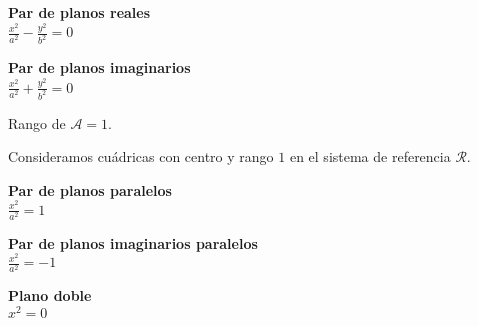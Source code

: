 \documentclass[11pt, a4paper]{article}
\newif\IfInSansMode
\theoremstyle{theorem-style}
\theoremstyle{definition-style}
\theoremstyle{remark-style}
\theoremstyle{example-style}
\begin{document}
\begin{minipage}[c]{0.45\textwidth}
  {\bf Par de planos reales}\vspace{1em}\\
  $\displaystyle \frac{{x}^2}{a^2} - \frac{{y}^2}{b^2}=0$
\end{minipage}\hfill\vspace{1em}
\begin{minipage}[]{0.45\textwidth}
\hfill
\end{minipage}

\begin{minipage}[c]{0.45\textwidth}
  {\bf Par de planos imaginarios}\vspace{1em}\\
  $\displaystyle \frac{{x}^2}{a^2} + \frac{{y}^2}{b^2}=0$
\end{minipage}\hfill\vspace{1em}
\begin{minipage}[]{0.45\textwidth}
\hfill
\end{minipage}

\vspace{1em}

Rango de $\mathcal A = 1$.

Consideramos cuádricas con centro y rango $1$ en el sistema de referencia $\mathcal R$.

\vspace{1em}

\begin{minipage}[c]{0.45\textwidth}
  {\bf Par de planos paralelos}\vspace{1em}\\
  $\displaystyle \frac{{x}^2}{a^2}=1$
\end{minipage}\hfill\vspace{1em}
\begin{minipage}[]{0.45\textwidth}
\hfill
\end{minipage}

\begin{minipage}[c]{0.45\textwidth}
  {\bf Par de planos imaginarios paralelos}\vspace{1em}\\
  $\displaystyle \frac{{x}^2}{a^2} =-1$
\end{minipage}\hfill\vspace{1em}
\begin{minipage}[]{0.45\textwidth}
\hfill
\end{minipage}

\begin{minipage}[c]{0.45\textwidth}
  {\bf Plano doble}\vspace{1em}\\
  $\displaystyle {{x}^2} = 0$
\end{minipage}\hfill\vspace{1em}
\begin{minipage}[]{0.45\textwidth}
\hfill
\end{minipage}
\end{document}
